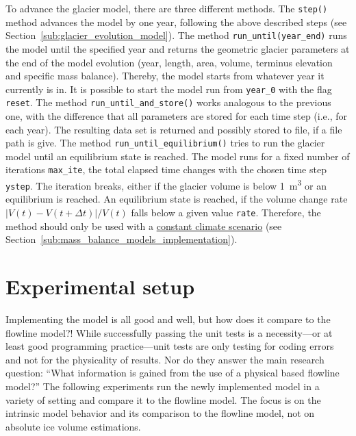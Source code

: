         To advance the glacier model, there are three different methods. The \lstinline`step()` method advances the model by one year, following the above described steps (see Section~\ref{sub:glacier_evolution_model}). The method \lstinline`run_until(year_end)` runs the model until the specified year and returns the geometric glacier parameters at the end of the model evolution (year, length, area, volume, terminus elevation and specific mass balance). Thereby, the model starts from whatever year it currently is in. It is possible to start the model run from \lstinline`year_0` with the flag \lstinline`reset`. The method \lstinline`run_until_and_store()` works analogous to the previous one, with the difference that all parameters are stored for each time step (i.e., for each year). The resulting data set is returned and possibly stored to file, if a file path is give. The method \lstinline`run_until_equilibrium()` tries to run the glacier model until an equilibrium state is reached. The model runs for a fixed number of iterations \lstinline`max_ite`, the total elapsed time changes with the chosen time step \lstinline`ystep`. The iteration breaks, either if the glacier volume is below \SI{1}{\cubic\meter} or an equilibrium is reached. An equilibrium state is reached, if the volume change rate $|V(t) - V(t+\Delta t)|/V(t)$ falls below a given value \lstinline`rate`. Therefore, the method should only be used with a \hyperref[ssub:constant_climate_scenario_implementation]{constant climate scenario} (see Section~\ref{sub:mass_balance_models_implementation}).
    



\section{Experimental setup} %
\label{sec:experimental_setup}
    
    Implementing the \vas{} model is all good and well, but how does it compare to the flowline model?!
    While successfully passing the unit tests is a necessity---or at least good programming practice---unit tests are only testing for coding errors and not for the physicality of results. Nor do they answer the main research question: ``What information is gained from the use of a physical based flowline model?'' The following experiments run the newly implemented \vas{} model in a variety of setting and compare it to the flowline model. The focus is on the intrinsic model behavior and its comparison to the flowline model, not on absolute ice volume estimations.


